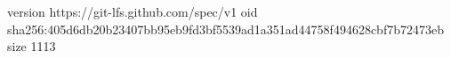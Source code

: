 version https://git-lfs.github.com/spec/v1
oid sha256:405d6db20b23407bb95eb9fd3bf5539ad1a351ad44758f494628cbf7b72473eb
size 1113
